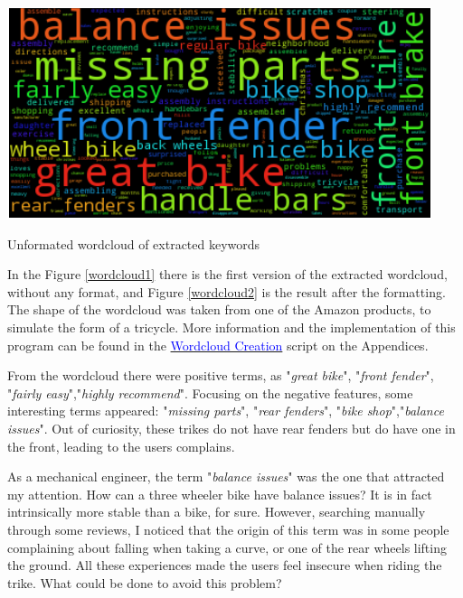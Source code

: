 \begin{marginfigure}
	\includegraphics[width=1.2\linewidth]{pdf/Amazon/Amazon_clean_files/Amazon_clean_4_1}
	\caption{Unformated wordcloud of extracted keywords}
	\label{wordcloud1}
\end{marginfigure}
	
	In the Figure \ref{wordcloud1} there is the first version of the extracted wordcloud, without any format, and Figure \ref{wordcloud2} is the result after the formatting. The shape of the wordcloud was taken from one of the Amazon products, to simulate the form of a tricycle. More information and the implementation of this program can be found in the \hyperref[Amazon]{\textcolor{blue}{Wordcloud Creation}} script on the Appendices.
	
	From the wordcloud there were positive terms, as "\textit{great bike}", "\textit{front fender}", "\textit{fairly easy}","\textit{highly recommend}". Focusing on the negative features, some interesting terms appeared: "\textit{missing parts}", "\textit{rear fenders}", "\textit{bike shop}","\textit{balance issues}". Out of curiosity, these trikes do not have rear fenders but do have one in the front, leading to the users complains.

As a mechanical engineer, the term "\textit{balance issues}" was the one that attracted my attention. How can a three wheeler bike have balance issues? It is in fact intrinsically more stable than a bike, for sure. However, searching manually through some reviews, I noticed that the origin of this term was in some people complaining about falling when taking a curve, or one of the rear wheels lifting the ground. All these experiences made the users feel insecure when riding the trike. What could be done to avoid this problem?

